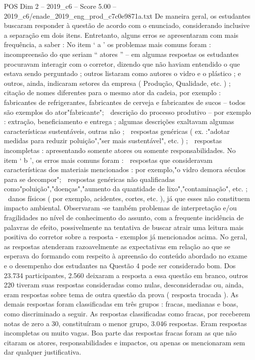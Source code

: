\begin{textsample}{POS Dim 2 – 2019\_c6 – Score 5.00 – 2019\_c6/enade\_2019\_eng\_prod\_c7c0e9871a.txt}
De maneira geral, os estudantes buscaram responder à questão de acordo com o enunciado, considerando inclusive a separação em dois itens.
Entretanto, alguns erros se apresentaram com mais frequência, a saber : No item ‘ a ’ os problemas mais comuns foram :  incompreensão do que seriam “ atores ” – em algumas respostas os estudantes procuravam interagir com o corretor, dizendo que não haviam entendido o que estava sendo perguntado ; outros listaram como autores o vidro e o plástico ; e outros, ainda, indicaram setores da empresa ( Produção, Qualidade, etc. ) ;  citação de nomes diferentes para o mesmo ator da cadeia, por exemplo : fabricantes de refrigerantes, fabricantes de cerveja e fabricantes de sucos – todos são exemplos do ator"fabricante";  descrição do processo produtivo – por exemplo : extração, beneficiamento e entrega ; algumas descrições exaltavam algumas características sustentáveis, outras não ;  respostas genéricas ( ex. :"adotar medidas para reduzir poluição","ser mais sustentável", etc. ) ;  respostas incompletas : apresentando somente atores ou somente responsabilidades.
No item ‘ b ’, os erros mais comuns foram :  respostas que consideravam características dos materiais mencionados : por exemplo,"o vidro demora séculos para se decompor";  respostas genéricas não qualificadas como"poluição","doenças","aumento da quantidade de lixo","contaminação", etc. ;  danos físicos ( por exemplo, acidentes, cortes, etc. ), já que esses não constituem impacto ambiental.
Observaram -se também problemas de interpretação e/ou fragilidades no nível de conhecimento do assunto, com a frequente incidência de palavras de efeito, possivelmente na tentativa de buscar atrair uma leitura mais positiva do corretor sobre a resposta - exemplos já mencionados acima.
No geral, as respostas atenderam razoavelmente as expectativas em relação ao que se esperava do formando com respeito à apreensão do conteúdo abordado no exame e o desempenho dos estudantes na Questão 4 pode ser considerado bom.
Dos 23.734 participantes, 2.560 deixaram a resposta a essa questão em branco, outros 220 tiveram suas respostas consideradas como nulas, desconsideradas ou, ainda, eram respostas sobre tema de outra questão da prova ( resposta trocada ).
As demais respostas foram classificadas em três grupos : fracas, medianas e boas, como discriminado a seguir.
As respostas classificadas como fracas, por receberem notas de zero a 30, constituíram o menor grupo, 3.046 respostas.
Eram respostas incompletas ou muito vagas.
Boa parte das respostas fracas foram as que não citaram os atores, responsabilidades e impactos, ou apenas os mencionaram sem dar qualquer justificativa.

\end{textsample}
